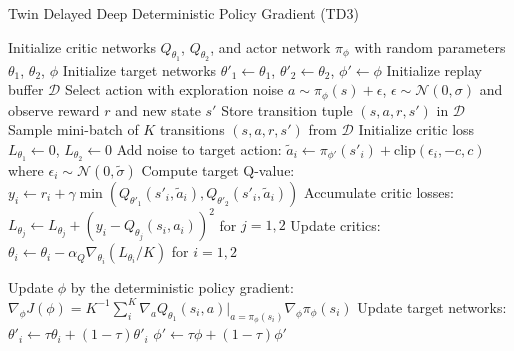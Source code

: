 \begin{algorithm}[H]
\caption{Twin Delayed Deep Deterministic Policy Gradient (TD3)}
\begin{algorithmic}[1]
\State Initialize critic networks $Q_{\theta_1}$, $Q_{\theta_2}$, and actor network $\pi_{\phi}$ with random parameters $\theta_1$, $\theta_2$, $\phi$
\State Initialize target networks $\theta'_1 \leftarrow \theta_1$, $\theta'_2 \leftarrow \theta_2$, $\phi' \leftarrow \phi$
\State Initialize replay buffer $\mathcal{D}$
\Repeat
    \State Select action with exploration noise $a \sim \pi_{\phi}(s) + \epsilon$, $\epsilon \sim \mathcal{N}(0, \sigma)$ and observe reward $r$ and new state $s'$
    \State Store transition tuple $(s, a, r, s')$ in $\mathcal{D}$
    \State Sample mini-batch of $K$ transitions $(s, a, r, s')$ from $\mathcal{D}$
    \State Initialize critic loss $L_{\theta_1} \leftarrow 0$, $L_{\theta_2} \leftarrow 0$
        \State Add noise to target action: $\tilde{a}_i \leftarrow \pi_{\phi'}(s'_i) + \text{clip}(\epsilon_i, -c, c)$ where $\epsilon_i \sim \mathcal{N}(0, \tilde{\sigma})$
        \State Compute target Q-value: $y_i \leftarrow r_i + \gamma \min(Q_{\theta'_1}(s'_i, \tilde{a}_i), Q_{\theta'_2}(s'_i, \tilde{a}_i))$
        \State Accumulate critic losses: $L_{\theta_j} \leftarrow L_{\theta_j} + (y_i - Q_{\theta_j}(s_i, a_i))^2$ for $j = 1, 2$
    \EndFor
    \State Update critics: $\theta_i \leftarrow \theta_i - \alpha_Q \nabla_{\theta_i}(L_{\theta_i}/K)$ for $i = 1, 2$

        \State Update $\phi$ by the deterministic policy gradient:
        \State $\nabla_{\phi}J(\phi) = K^{-1} \sum_{i}^{K} \nabla_a Q_{\theta_1}(s_i, a)|_{a=\pi_{\phi}(s_i)} \nabla_{\phi}\pi_{\phi}(s_i)$
        \State Update target networks:
        \State $\theta'_i \leftarrow \tau\theta_i + (1 - \tau)\theta'_i$
        \State $\phi' \leftarrow \tau\phi + (1 - \tau)\phi'$
    \EndIf
{}
\end{algorithmic}
\end{algorithm}